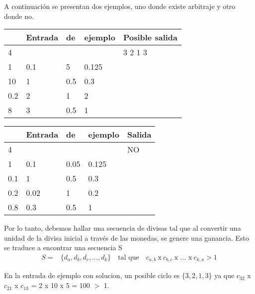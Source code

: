 A continuación se presentan dos ejemplos, uno donde existe arbitraje y otro donde no.
\begin{table}[!htb]
\begin{minipage}{.5\linewidth}
\begin{center}
	\begin{tabular}{ |l l l l|l| } 
		\hline
		&Entrada& de& ejemplo & Posible salida \\
		\hline
		4 &&&& 3 2 1 3 \\
		1& 0.1& 5& 0.125 & \\ 
		10& 1& 0.5& 0.3  & \\ 
		0.2& 2& 1& 2 & \\ 
		8& 3& 0.5& 1 & \\ 
		\hline
	\end{tabular}
\end{center}
\end{minipage}
\begin{minipage}{.5\linewidth}
\begin{center}
	\begin{tabular}{ |l l l l|l| } 
		\hline
		&Entrada& de& ejemplo & Salida\\
		\hline
		4 &&&& NO \\
		1& 0.1& 0.05& 0.125 & \\ 
		0.1& 1& 0.5& 0.3  & \\ 
		0.2& 0.02& 1& 0.2 & \\ 
		0.8& 0.3& 0.5& 1 & \\ 
		\hline
	\end{tabular}
\end{center}
\end{minipage}
\end{table}
\par
Por lo tanto, debemos hallar una secuencia de divisas tal que al convertir una unidad de la divisa inicial a través de las monedas, se genere una ganancia. Esto se traduce a encontrar una secuencia S 
\begin{align*}
S =& \{d_a, d_b, d_c, ... , d_k\}\quad \text{tal que} \quad c_{a,b} \: \text{x} \: c_{b,c} \: \text{x ... x} \: c_{k,a} > 1 
\end{align*}
\par
En la entrada de ejemplo con solucion, un posible ciclo es $\{3, 2, 1, 3\}$  ya que $c_{32}$ x $c_{21}$ x $c_{13}$ = 2 x 10 x 5 = 100 $>$ 1.

